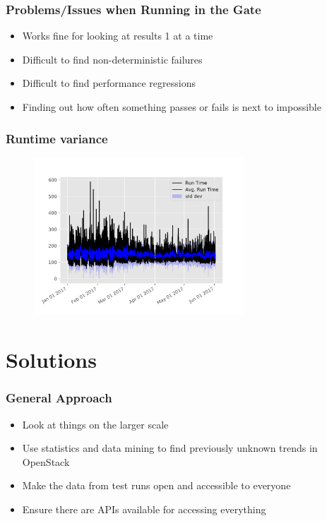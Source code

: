 \documentclass[aspectratio=169,11pt,hyperref={colorlinks=true}]{beamer}
\begin{document}
\begin{frame}
  \frametitle{Problems/Issues when Running in the Gate}
  \begin{itemize}
    \item Works fine for looking at results 1 at a time
    \item Difficult to find non-deterministic failures
    \item Difficult to find performance regressions
    \item Finding out how often something passes or fails is next to impossible
  \end{itemize}
\end{frame}

\begin{frame}
    \frametitle{Runtime variance}
    \begin{figure}
    \begin{center}
        \includegraphics[width=0.7\textwidth]{runtime_variance.png}
    \end{center}
    \end{figure}
\end{frame}

\section{Solutions}
\begin{frame}
  \frametitle{General Approach}
    \begin{itemize}
        \item Look at things on the larger scale
        \item Use statistics and data mining to find previously unknown trends
            in OpenStack
        \item Make the data from test runs open and accessible to everyone
        \item Ensure there are APIs available for accessing everything
    \end{itemize}
\end{frame}
\end{document}
